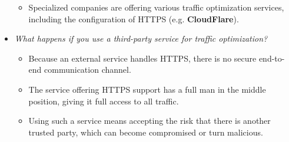 \documentclass[../main.tex]{subfiles}
\begin{document}
\begin{itemize}
\begin{itemize}
\begin{enumerate}
\end{enumerate}
\item Specialized companies are offering various traffic optimization services, including the configuration of HTTPS (e.g. \textbf{CloudFlare}).
\end{itemize}
\item \emph{What happens if you use a third-party service for traffic optimization?}
\begin{itemize}
\item Because an external service handles HTTPS, there is no secure end-to-end communication channel.
\item The service offering HTTPS support has a full man in the middle position, giving it full access to all traffic.
\item Using such a service means accepting the risk that there is another trusted party, which can become compromised or turn malicious.
\end{itemize}
\end{itemize}
\end{document}

